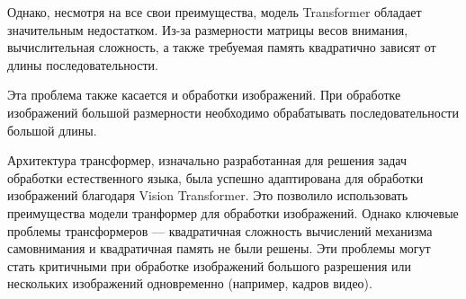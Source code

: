 \documentclass[times,specification,annotation]{itmo-student-thesis}
\begin{document}
Однако, несмотря на все свои преимущества, модель Transformer обладает значительным недостатком. Из-за размерности матрицы весов внимания, вычислительная сложность, а также требуемая память квадратично зависят от длины последовательности.

Эта проблема также касается и обработки изображений. При обработке изображений большой размерности необходимо обрабатывать последовательности большой длины.

\s\chapterconclusion
Архитектура трансформер, изначально разработанная для решения задач обработки естественного языка, была успешно адаптирована для обработки изображений благодаря Vision Transformer. Это позволило использовать преимущества модели транформер для обработки изображений. Однако ключевые проблемы трансформеров — квадратичная сложность вычислений механизма самовнимания и квадратичная память не были решены. Эти проблемы могут стать критичными при обработке изображений большого разрешения или нескольких изображений одновременно (например, кадров видео).
\end{document}
